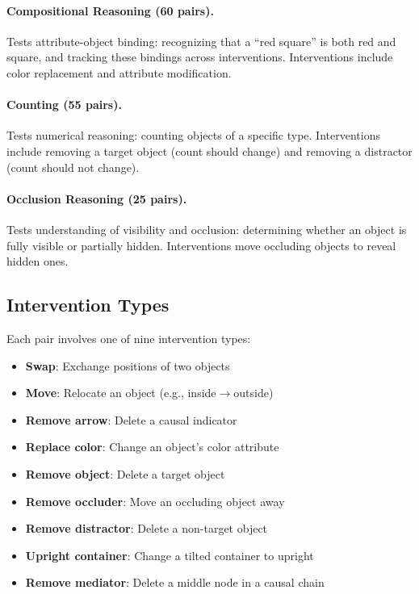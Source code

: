 \paragraph{Compositional Reasoning (60 pairs).} Tests attribute-object binding: recognizing that a ``red square'' is both red and square, and tracking these bindings across interventions. Interventions include color replacement and attribute modification.

\paragraph{Counting (55 pairs).} Tests numerical reasoning: counting objects of a specific type. Interventions include removing a target object (count should change) and removing a distractor (count should not change).

\paragraph{Occlusion Reasoning (25 pairs).} Tests understanding of visibility and occlusion: determining whether an object is fully visible or partially hidden. Interventions move occluding objects to reveal hidden ones.

\subsection{Intervention Types}
\label{sec:interventions}

Each pair involves one of nine intervention types:
\begin{itemize}[leftmargin=*,nosep]
    \item \textbf{Swap}: Exchange positions of two objects
    \item \textbf{Move}: Relocate an object (e.g., inside$\to$outside)
    \item \textbf{Remove arrow}: Delete a causal indicator
    \item \textbf{Replace color}: Change an object's color attribute
    \item \textbf{Remove object}: Delete a target object
    \item \textbf{Remove occluder}: Move an occluding object away
    \item \textbf{Remove distractor}: Delete a non-target object
    \item \textbf{Upright container}: Change a tilted container to upright
    \item \textbf{Remove mediator}: Delete a middle node in a causal chain
\end{itemize}

